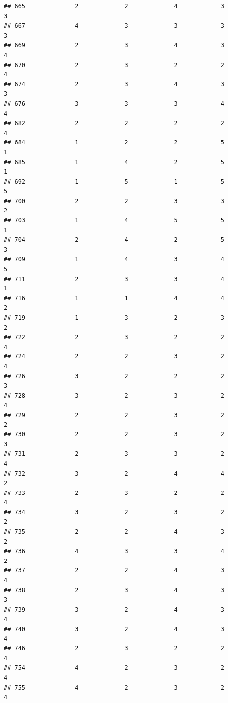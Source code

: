 \documentclass[
]{article}
\begin{document}
\begin{verbatim}
## 665              2             2             4            3          3
## 667              4             3             3            3          3
## 669              2             3             4            3          4
## 670              2             3             2            2          4
## 674              2             3             4            3          3
## 676              3             3             3            4          4
## 682              2             2             2            2          4
## 684              1             2             2            5          1
## 685              1             4             2            5          1
## 692              1             5             1            5          5
## 700              2             2             3            3          2
## 703              1             4             5            5          1
## 704              2             4             2            5          3
## 709              1             4             3            4          5
## 711              2             3             3            4          1
## 716              1             1             4            4          2
## 719              1             3             2            3          2
## 722              2             3             2            2          4
## 724              2             2             3            2          4
## 726              3             2             2            2          3
## 728              3             2             3            2          4
## 729              2             2             3            2          2
## 730              2             2             3            2          3
## 731              2             3             3            2          4
## 732              3             2             4            4          2
## 733              2             3             2            2          4
## 734              3             2             3            2          2
## 735              2             2             4            3          2
## 736              4             3             3            4          2
## 737              2             2             4            3          4
## 738              2             3             4            3          3
## 739              3             2             4            3          4
## 740              3             2             4            3          4
## 746              2             3             2            2          4
## 754              4             2             3            2          4
## 755              4             2             3            2          4

\end{verbatim}
\end{document}
